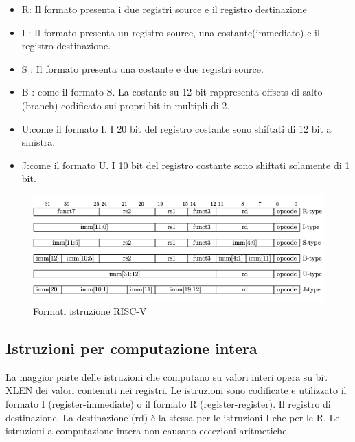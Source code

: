 \documentclass[12pt,a4paper]{report}
\begin{document}
\begin{itemize}
	\item R:  Il formato presenta i due registri source e il registro destinazione
	\item I : Il formato presenta un registro source, una costante(immediato) e il registro destinazione.
	\item S : Il formato presenta una costante e due registri source.
	\item B : come il formato S. La costante su 12 bit rappresenta offsets di salto (branch) codificato sui propri bit in multipli di 2.
	\item U:come il formato I. I 20 bit del registro costante sono shiftati di 12 bit a sinistra. 
	\item J:come  il formato U. I 10 bit del registro costante sono shiftati solamente di 1 bit. 
\end{itemize}

\begin{figure}
	\includegraphics[width = \textwidth]{FormatiIstruzione.png}
	\caption{Formati istruzione RISC-V}
	\label{Fig:Formati_istruzioni_RV32I}
\end{figure}


\subsection{Istruzioni per computazione intera}
La maggior parte delle istruzioni che computano su valori interi opera su bit XLEN dei valori contenuti nei registri. Le istruzioni sono codificate e utilizzato il formato I (register-immediate) o il formato R (register-register). Il registro di destinazione.  La destinazione (rd) è la stessa per le istruzioni I che per le R.  Le istruzioni a computazione intera non causano eccezioni aritmetiche.\\
\end{document}
